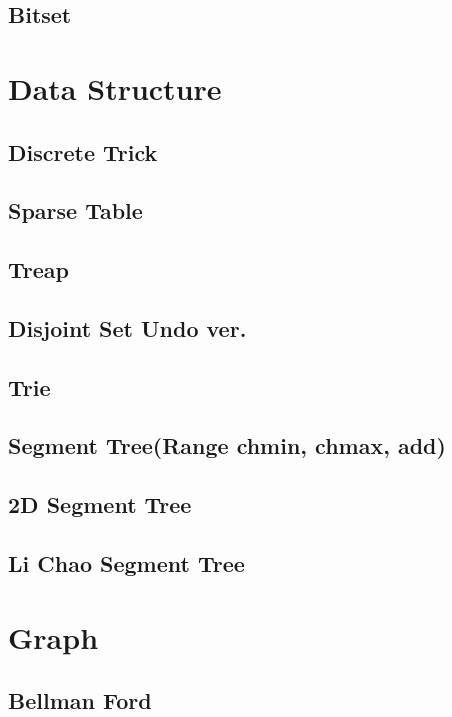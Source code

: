 \subsection{Bitset}


\section{Data Structure}
\subsection{Discrete Trick}

\subsection{Sparse Table}

\subsection{Treap}

\subsection{Disjoint Set Undo ver.}

\subsection{Trie}

\subsection{Segment Tree(Range chmin, chmax, add)}

\subsection{2D Segment Tree}

\subsection{Li Chao Segment Tree}


\section{Graph}
\subsection{Bellman Ford}

